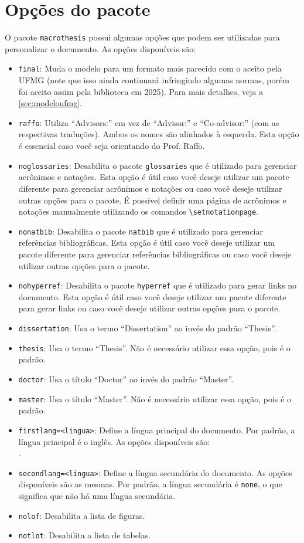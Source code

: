 \documentclass[dissertation,master,firstlang=english,secondlang=brazil]{macrothesis}
\begin{document}
\section{Opções do pacote}
O pacote \texttt{macrothesis} possui algumas opções que podem ser utilizadas para personalizar o documento. As opções disponíveis são:
\begin{itemize}
    \item \texttt{final}: Muda o modelo para um formato mais parecido com o aceito pela UFMG (note que isso ainda continuará infringindo algumas normas, porém foi aceito assim pela biblioteca em 2025). Para mais detalhes, veja a \cref{sec:modeloufmg}.
    \item \texttt{raffo}: Utiliza ``Advisors:'' em vez de ``Advisor:'' e ``Co-advisor:'' (com as respectivas traduções). Ambos os nomes são alinhados à esquerda. Esta opção é essencial caso você seja orientando do Prof. Raffo. 
    \item \texttt{noglossaries}: Desabilita o pacote \texttt{glossaries} que é utilizado para gerenciar acrônimos e notações. Esta opção é útil caso você deseje utilizar um pacote diferente para gerenciar acrônimos e notações ou caso você deseje utilizar outras opções para o pacote. É possível definir uma página de acrônimos e notações manualmente utilizando os comandos \texttt{\textbackslash setnotationpage}.
    \item \texttt{nonatbib}: Desabilita o pacote \texttt{natbib} que é utilizado para gerenciar referências bibliográficas. Esta opção é útil caso você deseje utilizar um pacote diferente para gerenciar referências bibliográficas ou caso você deseje utilizar outras opções para o pacote.
    \item \texttt{nohyperref}: Desabilita o pacote \texttt{hyperref} que é utilizado para gerar links no documento. Esta opção é útil caso você deseje utilizar um pacote diferente para gerar links ou caso você deseje utilizar outras opções para o pacote.
    \item \texttt{dissertation}: Usa o termo ``Dissertation'' ao invés do padrão ``Thesis''.
    \item \texttt{thesis}: Usa o termo ``Thesis''. Não é necessário utilizar essa opção, pois é o padrão.
    \item \texttt{doctor}: Usa o título ``Doctor'' ao invés do padrão ``Master''.
    \item \texttt{master}: Usa o título ``Master''. Não é necessário utilizar essa opção, pois é o padrão.
    \item \texttt{firstlang=<lingua>}: Define a língua principal do documento. Por padrão, a língua principal é o inglês. As opções disponíveis são: \\\emph{\supportedlangs}. 
    \item \texttt{secondlang=<lingua>}: Define a língua secundária do documento. As opções disponíveis são as mesmas. Por padrão, a língua secundária é \texttt{none}, o que significa que não há uma língua secundária.
    \item \texttt{nolof}: Desabilita a lista de figuras.
    \item \texttt{notlot}: Desabilita a lista de tabelas.
\end{itemize}
\end{document}
